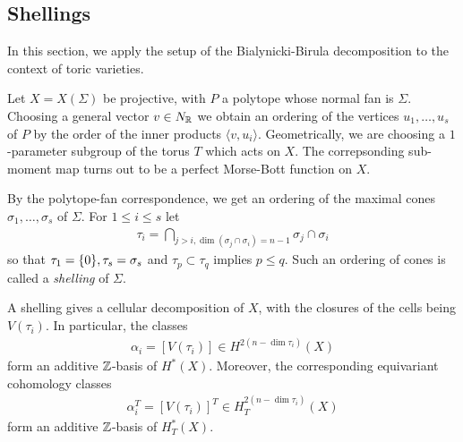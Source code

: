 \subsection{Shellings}
In this section, we apply the setup of the Bialynicki-Birula decomposition to the context of toric varieties.

Let $X = X(\Sigma)$ be projective, with $P$
a polytope whose normal fan is $\Sigma$. Choosing
a general vector $v\in N_{\mathbb{R}}$ we obtain an ordering of the vertices
$u_1,\ldots,u_s$ of $P$ by the order of the inner products $\langle v,u_i\rangle$.
Geometrically, we are choosing a $1$-parameter subgroup of the torus $T$
which acts on $X$. The correpsonding sub-moment map turns out to be
a perfect Morse-Bott function on $X$.

By the polytope-fan correspondence,
we get an ordering of the maximal cones $\sigma_1,\ldots,\sigma_s$ of $\Sigma$.
For $1\leq i \leq s$ let \begin{align*}
	\tau_i = \bigcap_{j>i, \dim(\sigma_j \cap \sigma_i) = n-1} \sigma_j \cap \sigma_i
\end{align*} so that
$\tau_1 = \{0\}, \tau_s = \sigma_s$ and $\tau_p \subset \tau_q$
implies $p \leq q$. Such an ordering of cones
is called a \emph{shelling} of $\Sigma$.

\begin{proposition}
	A shelling gives a cellular decomposition of $X$, with
	the closures of the cells being $V(\tau_i)$. In particular,
	the classes \begin{align*}
		\alpha_i = [V(\tau_i)] \in H^{2(n-\dim \tau_i)}(X)
	\end{align*}
	form an additive $\mathbb{Z}$-basis of $H^*(X)$. Moreover, the
	corresponding equivariant cohomology classes \begin{align*}
		\alpha_i^T = [V(\tau_i)]^T \in H^{2(n-\dim \tau_i)}_T(X)
	\end{align*} form an additive $\mathbb{Z}$-basis of $H^*_T(X)$.
\end{proposition}


